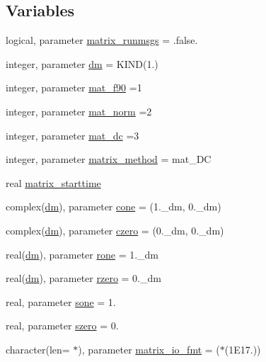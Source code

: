 \subsection*{Variables}
\begin{DoxyCompactItemize}
\item 
logical, parameter \mbox{\hyperlink{namespacematrixutils_a5c4836d18b8e1233dd130c5dc15e30fd}{matrix\+\_\+runmsgs}} = .false.
\item 
integer, parameter \mbox{\hyperlink{namespacematrixutils_a7bdc564986ea4d90f51201c75606ef3d}{dm}} = K\+I\+ND(1.)
\item 
integer, parameter \mbox{\hyperlink{namespacematrixutils_aacea55dcb267854e5e8df85c57122892}{mat\+\_\+f90}} =1
\item 
integer, parameter \mbox{\hyperlink{namespacematrixutils_a2ff32238b426e2f5a4e9d86da72402d2}{mat\+\_\+norm}} =2
\item 
integer, parameter \mbox{\hyperlink{namespacematrixutils_adc3f961dc571bc5ea1263f48e0574a79}{mat\+\_\+dc}} =3
\item 
integer, parameter \mbox{\hyperlink{namespacematrixutils_a7a9a7ea3dbe2beeff5a5f32de5f21dc3}{matrix\+\_\+method}} = mat\+\_\+\+DC
\item 
real \mbox{\hyperlink{namespacematrixutils_ab55e44d02787c32fab67dd16c8ebddef}{matrix\+\_\+starttime}}
\item 
complex(\mbox{\hyperlink{namespacematrixutils_a7bdc564986ea4d90f51201c75606ef3d}{dm}}), parameter \mbox{\hyperlink{namespacematrixutils_a0a58a765b3eead806d9adb27694692d8}{cone}} = (1.\+\_\+dm, 0.\+\_\+dm)
\item 
complex(\mbox{\hyperlink{namespacematrixutils_a7bdc564986ea4d90f51201c75606ef3d}{dm}}), parameter \mbox{\hyperlink{namespacematrixutils_a61466f9df90b39a99a491000d4419d75}{czero}} = (0.\+\_\+dm, 0.\+\_\+dm)
\item 
real(\mbox{\hyperlink{namespacematrixutils_a7bdc564986ea4d90f51201c75606ef3d}{dm}}), parameter \mbox{\hyperlink{namespacematrixutils_ad1137ea4186d00583875a1e7e08a721f}{rone}} = 1.\+\_\+dm
\item 
real(\mbox{\hyperlink{namespacematrixutils_a7bdc564986ea4d90f51201c75606ef3d}{dm}}), parameter \mbox{\hyperlink{namespacematrixutils_a0047cc2c6d161d05f23b748bb5b9a70a}{rzero}} = 0.\+\_\+dm
\item 
real, parameter \mbox{\hyperlink{namespacematrixutils_ae2555bb8da14eb27afe68ae794a858fb}{sone}} = 1.
\item 
real, parameter \mbox{\hyperlink{namespacematrixutils_ac00ea25825f3cb1ff949a87fad42094f}{szero}} = 0.
\item 
character(len= $\ast$), parameter \mbox{\hyperlink{namespacematrixutils_a34badd98b6ee7acb8ca038472adf2912}{matrix\+\_\+io\+\_\+fmt}} = \textquotesingle{}($\ast$(1\+E17.))\textquotesingle{}
\end{DoxyCompactItemize}


